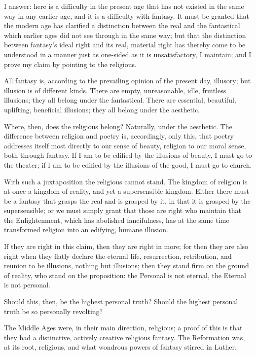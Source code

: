 \documentclass[12pt,a4paper]{book}
\begin{document}
I answer: here is a difficulty in the present age that has not existed in the same way in any earlier age, and it is a difficulty with fantasy. It must be granted that the modern age has clarified a distinction between the real and the fantastical which earlier ages did not see through in the same way; but that the distinction between fantasy's ideal right and its
real, material right has thereby come to be understood in a manner just as one-sided as it is unsatisfactory, I maintain; and I prove my claim by pointing to the religious.

All fantasy is, according to the prevailing opinion of the present day, illusory; but illusion is of different kinds. There are empty, unreasonable, idle, fruitless illusions; they all belong under the fantastical. There are essential, beautiful, uplifting, beneficial illusions; they all belong under the aesthetic.

Where, then, does the religious belong? Naturally, under the aesthetic. The difference between religion and poetry is, accordingly, only this, that poetry addresses itself most directly to our sense of beauty, religion to our moral sense, both through fantasy. If I am to be edified by the illusions of beauty, I must go to the theater; if I am to be edified by the illusions of the good, I must go to church.

With such a juxtaposition the religious cannot stand. The kingdom of religion is at once a kingdom of reality, and yet a supersensible kingdom. Either there must be a fantasy that grasps the real and is grasped by it, in that it is grasped by the supersensible; or we must simply grant that those are right who maintain that the Enlightenment, which has abolished fancifulness, has at the same time transformed religion into an edifying, humane illusion.

If they are right in this claim, then they are right in more; for then they are also right when they flatly declare the eternal life, resurrection, retribution, and reunion to be illusions, nothing but illusions; then they stand firm on the ground of reality, who stand on the proposition: the Personal is not eternal, the Eternal is not personal.

Should this, then, be the highest personal truth? Should the highest personal truth be so personally revolting?

The Middle Ages were, in their main direction, religious; a proof of this is that they had a distinctive, actively creative religious fantasy.
The Reformation was, at its root, religious, and what wondrous powers of fantasy stirred in Luther.
\end{document}
